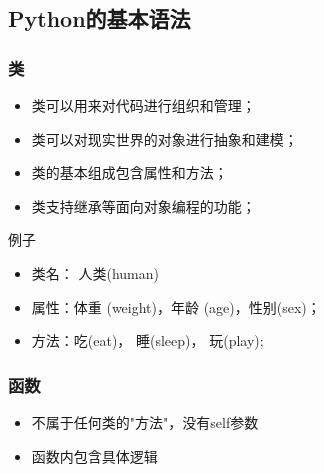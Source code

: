 \documentclass[11pt]{beamer}
\begin{document}
\subsection{Python的基本语法}
\begin{frame}[fragile]
	\frametitle{类}
	\begin{minipage}[t]{0.5\linewidth}
		\begin{itemize}
			\item 类可以用来对代码进行组织和管理；
			\item 类可以对现实世界的对象进行抽象和建模；
			\item 类的基本组成包含属性和方法；
			\item 类支持继承等面向对象编程的功能；
		\end{itemize}

		例子
		\begin{itemize}
			\item 类名： 人类(human)
			\item 属性：体重 (weight)，年龄 (age)，性别(sex)；
			\item 方法：吃(eat)， 睡(sleep)， 玩(play);
		\end{itemize}
	\end{minipage}%
	\begin{minipage}[t]{0.05\linewidth}
		\quad
	\end{minipage}%
	\begin{minipage}[t]{0.4\linewidth}
		\begin{figure}
			
		\end{figure}
	\end{minipage}
\end{frame}

\begin{frame}[fragile]
	\frametitle{函数}
	\begin{minipage}[t]{0.4\linewidth}
		\begin{itemize}
			\item 不属于任何类的"方法"，没有self参数
			\item 函数内包含具体逻辑
		\end{itemize}
	\end{minipage}%
	\begin{minipage}[t]{0.05\linewidth}
		\quad 	%
	\end{minipage}%
	\begin{minipage}[t]{0.5\linewidth}
		

		
	\end{minipage}
\end{frame}
\end{document}
